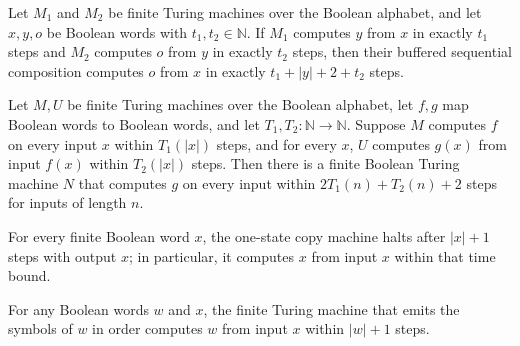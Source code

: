 \begin{theorem}
\label{Turing.FinTM.bufferedCompTM_computesInTime}
\leanok
{}
Let $M_1$ and $M_2$ be finite Turing machines over the Boolean alphabet, and let $x,y,o$
be Boolean words with $t_1,t_2\in\mathbb{N}$. If $M_1$ computes $y$ from $x$ in exactly
$t_1$ steps and $M_2$ computes $o$ from $y$ in exactly $t_2$ steps, then their buffered
sequential composition computes $o$ from $x$ in exactly $t_1+|y|+2+t_2$ steps.
\end{theorem}

\begin{theorem}
\label{Turing.FinTM.exists_comp_on_image}
\leanok
{}
Let $M,U$ be finite Turing machines over the Boolean alphabet, let $f,g$ map Boolean
words to Boolean words, and let $T_1,T_2:\mathbb{N}\to\mathbb{N}$. Suppose $M$ computes
$f$ on every input $x$ within $T_1(|x|)$ steps, and for every $x$, $U$ computes $g(x)$
from input $f(x)$ within $T_2(|x|)$ steps. Then there is a finite Boolean Turing machine
$N$ that computes $g$ on every input within $2T_1(n)+T_2(n)+2$ steps for inputs of
length $n$.
\end{theorem}

\begin{theorem}
\label{Turing.FinTM.idTM_computes}
\leanok
{}
For every finite Boolean word $x$, the one-state copy machine halts after $|x|+1$ steps
with output $x$; in particular, it computes $x$ from input $x$ within that time bound.
\end{theorem}

\begin{theorem}
\label{Turing.FinTM.constTM_computes}
\leanok
{}
For any Boolean words $w$ and $x$, the finite Turing machine that emits the symbols of
$w$ in order computes $w$ from input $x$ within $|w|+1$ steps.
\end{theorem}

